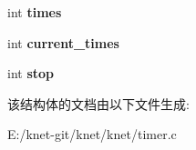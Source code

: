 \begin{DoxyCompactItemize}
\item 
\hypertarget{struct__ktimer__t_a6b65efd78ea3c5e6cee2c0992cd0cead}{}int {\bfseries times}\label{struct__ktimer__t_a6b65efd78ea3c5e6cee2c0992cd0cead}

\item 
\hypertarget{struct__ktimer__t_abad8750e54845862d2768b348997db69}{}int {\bfseries current\+\_\+times}\label{struct__ktimer__t_abad8750e54845862d2768b348997db69}

\item 
\hypertarget{struct__ktimer__t_afbde3157e6d8d730adcfd5463ed7b131}{}int {\bfseries stop}\label{struct__ktimer__t_afbde3157e6d8d730adcfd5463ed7b131}

\end{DoxyCompactItemize}


该结构体的文档由以下文件生成\+:\begin{DoxyCompactItemize}
\item 
E\+:/knet-\/git/knet/knet/timer.\+c\end{DoxyCompactItemize}
